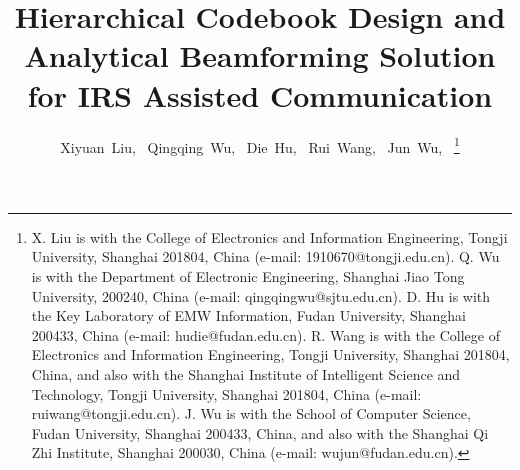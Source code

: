 \documentclass[12pt,draftclsnofoot,onecolumn]{IEEEtran}
\begin{document}
\renewcommand{\qedsymbol}{}
%

\title{Hierarchical Codebook Design and Analytical Beamforming Solution for IRS Assisted Communication }

\author{
	Xiyuan~Liu,~
	Qingqing~Wu,~
	Die~Hu,~
	Rui~Wang,~
	Jun~Wu,~
	\thanks{X. Liu is with the College of Electronics and Information Engineering, Tongji University, Shanghai 201804, China (e-mail: 1910670@tongji.edu.cn).
		Q. Wu is with the Department of Electronic Engineering, Shanghai Jiao Tong University, 200240, China (e-mail: qingqingwu@sjtu.edu.cn).
		D. Hu is with the Key Laboratory of EMW Information, Fudan University, Shanghai 200433, China (e-mail: hudie@fudan.edu.cn).
		R. Wang is with the College of Electronics and Information Engineering, Tongji University, Shanghai 201804, China, and also with the Shanghai Institute of Intelligent Science and Technology, Tongji University, Shanghai 201804, China (e-mail: ruiwang@tongji.edu.cn).
		J. Wu is with the School of Computer Science, Fudan University, Shanghai 200433, China, and also with the Shanghai Qi Zhi Institute, Shanghai 200030, China (e-mail: wujun@fudan.edu.cn).}	
}	

\maketitle




% 
\end{document}
